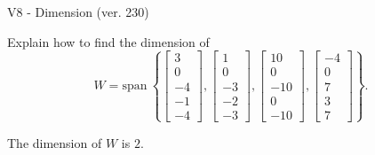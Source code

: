 \begin{exercise}
  \begin{exerciseTitle}V8 - Dimension (ver. 230)\end{exerciseTitle}
  \begin{exerciseStatement}
    Explain how to find the dimension of 
\[W=\mathrm{span}\ \left\{\left[\begin{array}{r}
3 \\
0 \\
-4 \\
-1 \\
-4
\end{array}\right] , \left[\begin{array}{r}
1 \\
0 \\
-3 \\
-2 \\
-3
\end{array}\right] , \left[\begin{array}{r}
10 \\
0 \\
-10 \\
0 \\
-10
\end{array}\right] , \left[\begin{array}{r}
-4 \\
0 \\
7 \\
3 \\
7
\end{array}\right]\right\}.\]



  \end{exerciseStatement}
  \begin{exerciseAnswer}
   The dimension of \(W\) is  \(2\).
  


  \end{exerciseAnswer}
\end{exercise}